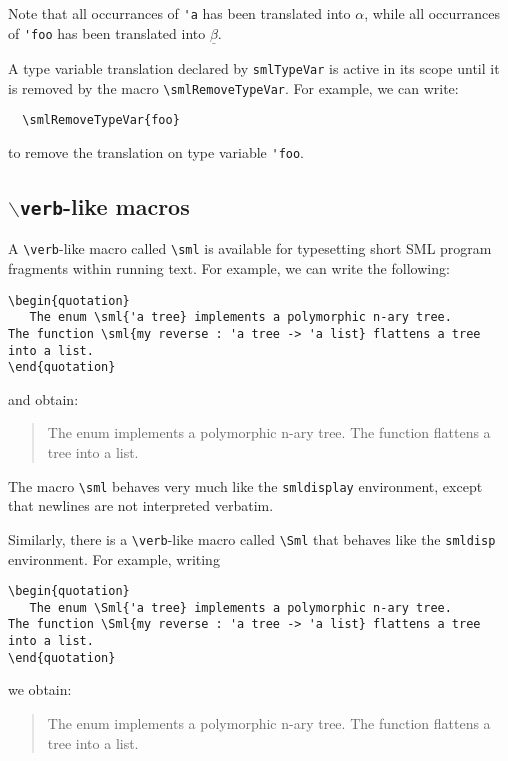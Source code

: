 Note that all occurrances of \verb|'a| has been translated into
$\alpha$, while all occurrances of \verb|'foo| has been translated
into $\underline\beta$.

A type variable translation declared by \verb|smlTypeVar| is active
in its scope until it is removed by 
the macro \verb|\smlRemoveTypeVar|.
For example, we can write:
\begin{verbatim}
  \smlRemoveTypeVar{foo}
\end{verbatim}
to remove the translation on type variable \verb|'foo|.


\subsection{{\tt $\backslash${verb}}-like macros}
A \verb|\verb|-like macro called \verb|\sml| is available for typesetting
short SML program fragments within running text.  
For example, we can write the following:
\begin{verbatim}
\begin{quotation}
   The enum \sml{'a tree} implements a polymorphic n-ary tree.
The function \sml{my reverse : 'a tree -> 'a list} flattens a tree into a list.
\end{quotation}
\end{verbatim}
and obtain:
\begin{quotation}
   The enum  implements a polymorphic n-ary tree.
The function  flattens a tree into a list.
\end{quotation}
The macro \verb|\sml| behaves very much like the \verb|smldisplay|
environment, except that newlines are not interpreted verbatim.

Similarly, there is a \verb|\verb|-like macro called \verb|\Sml| that
behaves like the \verb|smldisp| environment.  For example, writing
\begin{verbatim}
\begin{quotation}
   The enum \Sml{'a tree} implements a polymorphic n-ary tree.
The function \Sml{my reverse : 'a tree -> 'a list} flattens a tree into a list.
\end{quotation}
\end{verbatim}
we obtain:
\begin{quotation}
   The enum  implements a polymorphic n-ary tree.
The function  flattens a tree into a list.
\end{quotation}

